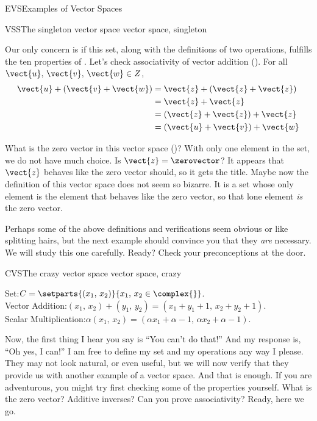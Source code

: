 \begin{subsect}{EVS}{Examples of Vector Spaces}
\begin{example}{VSS}{The singleton vector space }{vector space, singleton}
%
\begin{para}Our only concern is if this set, along with the definitions of two operations, fulfills the ten properties of .  Let's check associativity of vector addition ().  For all $\vect{u},\,\vect{v},\,\vect{w}\in Z$,
%
\begin{align*}
\vect{u}+(\vect{v}+\vect{w})
&=\vect{z}+(\vect{z}+\vect{z})\\
&=\vect{z}+\vect{z}\\
&=(\vect{z}+\vect{z})+\vect{z}\\
&=(\vect{u}+\vect{v})+\vect{w}
\end{align*}\end{para}
%
\begin{para}What is the zero vector in this vector space ()?  With only one element in the set, we do not have much choice.  Is $\vect{z}=\zerovector$?  It appears that $\vect{z}$ behaves like the zero vector should, so it gets the title.  Maybe now the definition of this vector space does not seem so bizarre.  It is a set whose only element is the element that behaves like the zero vector, so that lone element {\em is} the zero vector.\end{para}
%
\end{example}
%
\begin{para}Perhaps some of the above definitions and verifications seem obvious or like splitting hairs, but the next example should convince you that they {\em are} necessary.  We will study this one carefully.  Ready?  Check your preconceptions at the door.\end{para}
%
\begin{example}{CVS}{The crazy vector space }{vector space, crazy}
\begin{para}Set:\quad $C=\setparts{(x_1,\,x_2)}{x_1,\,x_2\in\complex{\null}}$.\\
Vector Addition:\quad  $(x_1,\,x_2)+(y_1,\,y_2)=(x_1+y_1+1,\,x_2+y_2+1)$.\\
Scalar Multiplication:\quad $\alpha(x_1,\,x_2)=(\alpha x_1+\alpha-1,\,\alpha x_2+\alpha-1)$.\end{para}
%
\begin{para}Now, the first thing I hear you say is ``You can't do that!''  And my response is, ``Oh yes, I can!''  I am free to define my set and my operations any way I please.  They may not look natural, or even useful, but we will now verify that they provide us with another example of a vector space.  And that is enough.  If you are adventurous, you might try first checking some of the properties yourself.  What is the zero vector?  Additive inverses?  Can you prove associativity?  Ready, here we go.\end{para}

\end{example}
\end{subsect}
